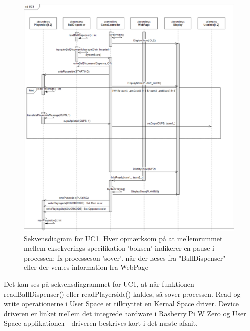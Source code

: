 \documentclass[Rapport/Rapport_main.tex]{subfiles}
\begin{document}
\begin{figure}[H]
    \centering
    \includegraphics[width=\textwidth]{Arkitektur/Softwarearkitektur/Applikationsmodel/RPi/graphics_RPi/UC1_SD.png}
    \caption{Sekvensdiagram for UC1. Hver opmærksom på at mellemrummet mellem eksekverings specifikation 'boksen' indikerer en pause i processen; fx processeson 'sover', når der læses fra "BallDispenser" eller der ventes information fra WebPage}
    \label{fig:UC1_SD_RPi_RAP}
\end{figure}
Det kan ses på sekvensdiagrammet for UC1, at når funktionen readBallDispenser() eller readPlayerside() kaldes, så sover processen. Read og write operationerne i User Space er tilknyttet en Kernal Space driver. Device driveren er linket mellem det integrede hardware i Rasberry Pi W Zero og User Space applikationen - driveren beskrives kort i det næste afsnit. 
\end{document}
